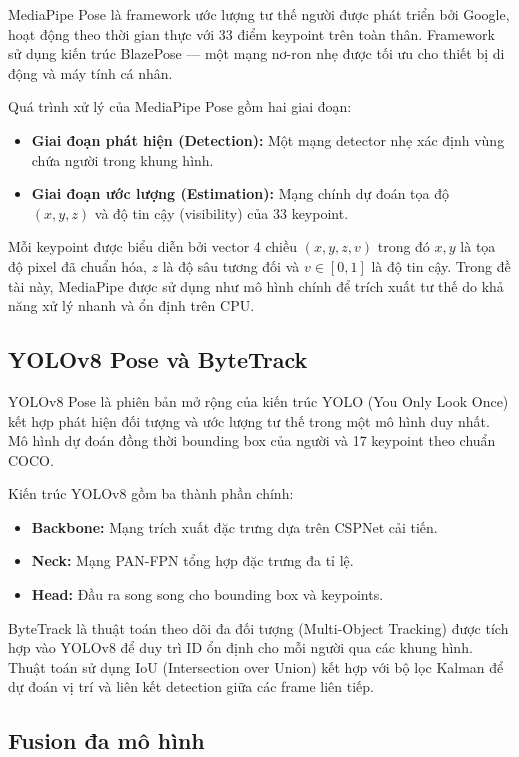 MediaPipe Pose là framework ước lượng tư thế người được phát triển bởi Google, hoạt động theo thời gian thực với 33 điểm keypoint trên toàn thân. Framework sử dụng kiến trúc BlazePose — một mạng nơ-ron nhẹ được tối ưu cho thiết bị di động và máy tính cá nhân.

Quá trình xử lý của MediaPipe Pose gồm hai giai đoạn:

\begin{itemize}
    \item \textbf{Giai đoạn phát hiện (Detection):} Một mạng detector nhẹ xác định vùng chứa người trong khung hình.
    \item \textbf{Giai đoạn ước lượng (Estimation):} Mạng chính dự đoán tọa độ $(x, y, z)$ và độ tin cậy (visibility) của 33 keypoint.
\end{itemize}

Mỗi keypoint được biểu diễn bởi vector 4 chiều $(x, y, z, v)$ trong đó $x, y$ là tọa độ pixel đã chuẩn hóa, $z$ là độ sâu tương đối và $v \in [0, 1]$ là độ tin cậy. Trong đề tài này, MediaPipe được sử dụng như mô hình chính để trích xuất tư thế do khả năng xử lý nhanh và ổn định trên CPU.

\subsection{YOLOv8 Pose và ByteTrack}

YOLOv8 Pose là phiên bản mở rộng của kiến trúc YOLO (You Only Look Once) kết hợp phát hiện đối tượng và ước lượng tư thế trong một mô hình duy nhất. Mô hình dự đoán đồng thời bounding box của người và 17 keypoint theo chuẩn COCO.

Kiến trúc YOLOv8 gồm ba thành phần chính:
\begin{itemize}
    \item \textbf{Backbone:} Mạng trích xuất đặc trưng dựa trên CSPNet cải tiến.
    \item \textbf{Neck:} Mạng PAN-FPN tổng hợp đặc trưng đa tỉ lệ.
    \item \textbf{Head:} Đầu ra song song cho bounding box và keypoints.
\end{itemize}

ByteTrack là thuật toán theo dõi đa đối tượng (Multi-Object Tracking) được tích hợp vào YOLOv8 để duy trì ID ổn định cho mỗi người qua các khung hình. Thuật toán sử dụng IoU (Intersection over Union) kết hợp với bộ lọc Kalman để dự đoán vị trí và liên kết detection giữa các frame liên tiếp.

\subsection{Fusion đa mô hình}


